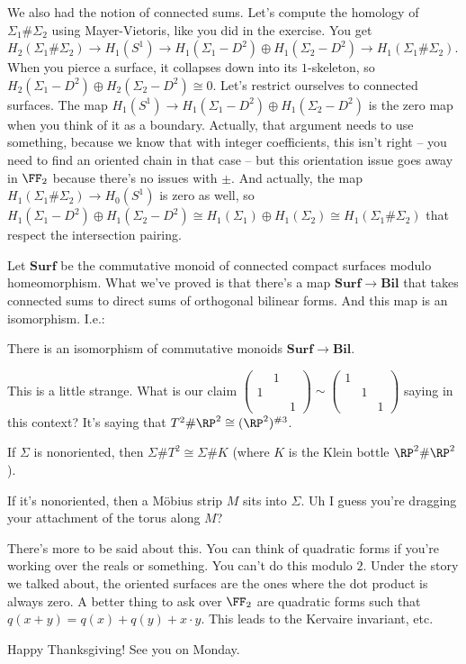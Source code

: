 We also had the notion of connected sums. Let's compute the homology of $\Sigma_1\#\Sigma_2$ using Mayer-Vietoris, like you did in the exercise. You get $ H_2(\Sigma_1\#\Sigma_2)\to H_1(S^1)\to H_1(\Sigma_1-D^2)\oplus H_1(\Sigma_2-D^2)\to H_1(\Sigma_1\#\Sigma_2)$. When you pierce a surface, it collapses down into its $1$-skeleton, so $ H_2(\Sigma_1-D^2)\oplus H_2(\Sigma_2-D^2)\cong 0$. Let's restrict ourselves to connected surfaces. The map $ H_1(S^1)\to H_1(\Sigma_1-D^2)\oplus H_1(\Sigma_2-D^2)$ is the zero map when you think of it as a boundary. Actually, that argument needs to use something, because we know that with integer coefficients, this isn't right -- you need to find an oriented chain in that case -- but this orientation issue goes away in $\FF_2$ because there's no issues with $\pm$. And actually, the map $ H_1(\Sigma_1\#\Sigma_2)\to H_0(S^1)$ is zero as well, so $ H_1(\Sigma_1-D^2)\oplus H_1(\Sigma_2-D^2)\cong H_1(\Sigma_1)\oplus H_1(\Sigma_2)\cong H_1(\Sigma_1\#\Sigma_2)$ that respect the intersection pairing.

Let $\mathbf{Surf}$ be the commutative monoid of connected compact surfaces modulo homeomorphism. What we've proved is that there's a map $\mathbf{Surf}\to\mathbf{Bil}$ that takes connected sums to direct sums of orthogonal bilinear forms. And this map is an isomorphism. I.e.:
\begin{theorem}
There is an isomorphism of commutative monoids $\mathbf{Surf}\to\mathbf{Bil}$.
\end{theorem}
This is a little strange. What is our claim $\begin{pmatrix}
 & 1 & \\
1 & & \\
 & & 1
\end{pmatrix}
\sim
\begin{pmatrix}
1 & & \\
& 1 & \\
& & 1
\end{pmatrix}$ saying in this context? It's saying that $T^2\#\RP^2\cong(\RP^2)^{\# 3}$.
\begin{claim}
If $\Sigma$ is nonoriented, then $\Sigma\# T^2\cong\Sigma\# K$ (where $K$ is the Klein bottle $\RP^2\#\RP^2$).
\end{claim}
If it's nonoriented, then a M\"obius strip $M$ sits into $\Sigma$. Uh I guess you're dragging your attachment of the torus along $M$?

There's more to be said about this. You can think of quadratic forms if you're working over the reals or something. You can't do this modulo $2$. Under the story we talked about, the oriented surfaces are the ones where the dot product is always zero. A better thing to ask over $\FF_2$ are quadratic forms such that $q(x+y)=q(x)+q(y)+x\cdot y$. This leads to the Kervaire invariant, etc.

Happy Thanksgiving! See you on Monday.

